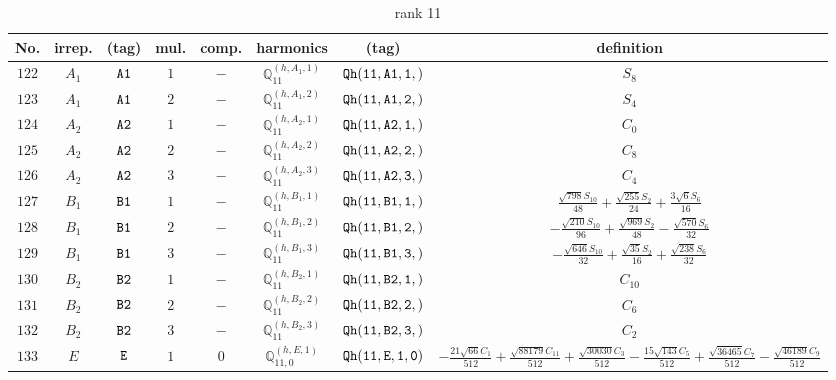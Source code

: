 \documentclass[fleqn,8pt]{jsarticle}
\begin{document}
\begin{table}[ht!]
\begin{center}
\caption{rank 11}
\renewcommand{\arraystretch}{1.3}
\begin{tabular}{cccccccc} \hline \hline
No. & irrep. & (tag) & mul. & comp. & harmonics & (tag) & definition \\ \hline
$ 122 $ & $ A_{1} $ & $ {\tt A1} $ & $ 1 $ & $ - $ & $ \mathbb{Q}_{11}^{(h,A_{1},1)} $ & $ {\tt Qh(11,A1,1,)} $ & $ S_{8} $ \\
$ 123 $ & $ A_{1} $ & $ {\tt A1} $ & $ 2 $ & $ - $ & $ \mathbb{Q}_{11}^{(h,A_{1},2)} $ & $ {\tt Qh(11,A1,2,)} $ & $ S_{4} $ \\
$ 124 $ & $ A_{2} $ & $ {\tt A2} $ & $ 1 $ & $ - $ & $ \mathbb{Q}_{11}^{(h,A_{2},1)} $ & $ {\tt Qh(11,A2,1,)} $ & $ C_{0} $ \\
$ 125 $ & $ A_{2} $ & $ {\tt A2} $ & $ 2 $ & $ - $ & $ \mathbb{Q}_{11}^{(h,A_{2},2)} $ & $ {\tt Qh(11,A2,2,)} $ & $ C_{8} $ \\
$ 126 $ & $ A_{2} $ & $ {\tt A2} $ & $ 3 $ & $ - $ & $ \mathbb{Q}_{11}^{(h,A_{2},3)} $ & $ {\tt Qh(11,A2,3,)} $ & $ C_{4} $ \\
$ 127 $ & $ B_{1} $ & $ {\tt B1} $ & $ 1 $ & $ - $ & $ \mathbb{Q}_{11}^{(h,B_{1},1)} $ & $ {\tt Qh(11,B1,1,)} $ & $ \frac{\sqrt{798} S_{10}}{48} + \frac{\sqrt{255} S_{2}}{24} + \frac{3 \sqrt{6} S_{6}}{16} $ \\
$ 128 $ & $ B_{1} $ & $ {\tt B1} $ & $ 2 $ & $ - $ & $ \mathbb{Q}_{11}^{(h,B_{1},2)} $ & $ {\tt Qh(11,B1,2,)} $ & $ - \frac{\sqrt{210} S_{10}}{96} + \frac{\sqrt{969} S_{2}}{48} - \frac{\sqrt{570} S_{6}}{32} $ \\
$ 129 $ & $ B_{1} $ & $ {\tt B1} $ & $ 3 $ & $ - $ & $ \mathbb{Q}_{11}^{(h,B_{1},3)} $ & $ {\tt Qh(11,B1,3,)} $ & $ - \frac{\sqrt{646} S_{10}}{32} + \frac{\sqrt{35} S_{2}}{16} + \frac{\sqrt{238} S_{6}}{32} $ \\
$ 130 $ & $ B_{2} $ & $ {\tt B2} $ & $ 1 $ & $ - $ & $ \mathbb{Q}_{11}^{(h,B_{2},1)} $ & $ {\tt Qh(11,B2,1,)} $ & $ C_{10} $ \\
$ 131 $ & $ B_{2} $ & $ {\tt B2} $ & $ 2 $ & $ - $ & $ \mathbb{Q}_{11}^{(h,B_{2},2)} $ & $ {\tt Qh(11,B2,2,)} $ & $ C_{6} $ \\
$ 132 $ & $ B_{2} $ & $ {\tt B2} $ & $ 3 $ & $ - $ & $ \mathbb{Q}_{11}^{(h,B_{2},3)} $ & $ {\tt Qh(11,B2,3,)} $ & $ C_{2} $ \\
$ 133 $ & $ E $ & $ {\tt E} $ & $ 1 $ & $ 0 $ & $ \mathbb{Q}_{11,0}^{(h,E,1)} $ & $ {\tt Qh(11,E,1,0)} $ & $ - \frac{21 \sqrt{66} C_{1}}{512} + \frac{\sqrt{88179} C_{11}}{512} + \frac{\sqrt{30030} C_{3}}{512} - \frac{15 \sqrt{143} C_{5}}{512} + \frac{\sqrt{36465} C_{7}}{512} - \frac{\sqrt{46189} C_{9}}{512} $ \\

\end{tabular}
\end{center}
\end{table}
\end{document}
